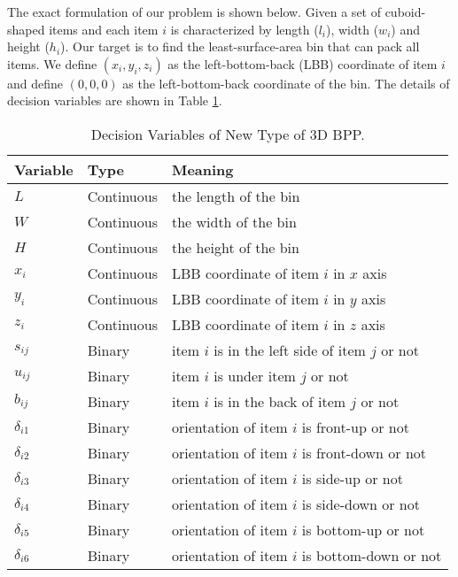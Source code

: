 The exact formulation of our problem is shown below. Given a set of cuboid-shaped items and each item $i$ is characterized by length ($l_i$), width ($w_i$) and height ($h_i$). Our target is to find the least-surface-area bin that can pack all items. 
We define $(x_i, y_i, z_i)$ as the left-bottom-back (LBB) coordinate of item 
$i$ and define $(0,0,0)$ as the left-bottom-back coordinate of the bin. 
The details of decision variables are shown in Table \ref{variable table}. 
\begin{table}[th]
	\small
	\centering
	\caption{Decision Variables of New Type of 3D BPP. }
	\label{variable table}
	\begin{tabular}{lll}
		\hline
		Variable           &  Type              & Meaning \\ \hline
		$L$			& Continuous   & the length of the bin                                                                 \\ %
		$W$			& Continuous   & the width of the bin								 \\ %
		$H$			& Continuous   & the height of the bin 							\\ %
		$x_{i}$             &   Continuous  & LBB coordinate of item $i$ in $x$ axis        \\ %
		$y_i$               &   Continuous  &  LBB coordinate of item $i$ in $y$ axis                                                 \\ %
		$z_i$               &   Continuous   & LBB coordinate of item $i$ in $z$ axis             \\ %
		$s_{ij}$	      &    Binary	&  item $i$ is in the left side of item $j$ or not                        \\ %
		$u_{ij}$	      &   Binary         &  item $i$ is under item $j$ or not                                    \\ %
		$b_{ij}$	      &    Binary 	&  item $i$  is in the back of item $j$	or not		\\ %
		${\delta}_{i1}$ &   Binary		&  orientation of item $i$ is front-up or not              \\ %
		${\delta}_{i2}$ &   Binary		&  orientation of item $i$ is front-down or not                       \\ %
		${\delta}_{i3}$ & Binary		&  orientation of item $i$ is side-up or not                      \\ %
		${\delta}_{i4}$ & Binary		&  orientation of item $i$ is side-down or not                   \\ %
		${\delta}_{i5}$ & Binary		&  orientation of item $i$ is bottom-up  or not                      \\ %
		${\delta}_{i6}$ & Binary		&  orientation of item $i$ is bottom-down or not                       \\ \hline
	\end{tabular} 
\end{table}

